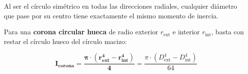 \begin{ImportanteBox}
\begin{itemize}
              Al ser el círculo simétrico en todas las direcciones radiales, cualquier diámetro que pase por su centro tiene exactamente el mismo momento de inercia.



              Para una \textbf{corona circular hueca} de radio exterior $r_{\text{ext}}$ e interior $r_{\text{int}}$, basta con restar el círculo hueco del círculo macizo:

              \begin{equation}
                  \mathbf{I_{\text{corona}} = \frac{\pi \cdot \left(r_{\text{ext}}^4 - r_{\text{int}}^4\right)}{4}} = \frac{\pi \cdot \left(D_{\text{ext}}^4 - D_{\text{int}}^4\right)}{64}
\end{equation}

    \end{itemize}

\end{ImportanteBox}



